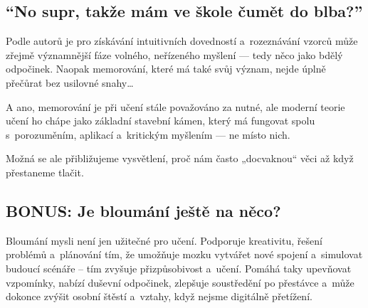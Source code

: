\documentclass[main.tex]{subfiles}
\begin{document}
\subsection*{\enquote{No supr, takže mám ve škole čumět do blba?}}
Podle autorů je pro získávání intuitivních dovedností a~rozeznávání vzorců může zřejmě významnější fáze volného, neřízeného myšlení — tedy něco jako bdělý odpočinek. Naopak memorování, které má také svůj význam, nejde úplně přečůrat bez usilovné snahy…\par
A ano, memorování je při učení stále považováno za nutné, ale moderní teorie učení ho chápe jako základní stavební kámen, který má fungovat spolu s~porozuměním, aplikací a~kritickým myšlením — ne místo nich.\par
Možná se ale přibližujeme vysvětlení, proč nám často „docvaknou“ věci až když přestaneme tlačit.
\subsection*{BONUS: Je bloumání ještě na něco?}
Bloumání mysli není jen užitečné pro učení. Podporuje kreativitu, řešení problémů a~plánování tím, že umožňuje mozku vytvářet nové spojení a~simulovat budoucí scénáře – tím zvyšuje přizpůsobivost a~učení. Pomáhá taky upevňovat vzpomínky, nabízí duševní odpočinek, zlepšuje soustředění po přestávce a~může dokonce zvýšit osobní štěstí a~vztahy, když nejsme digitálně přetížení.
\newpage
\end{document}
